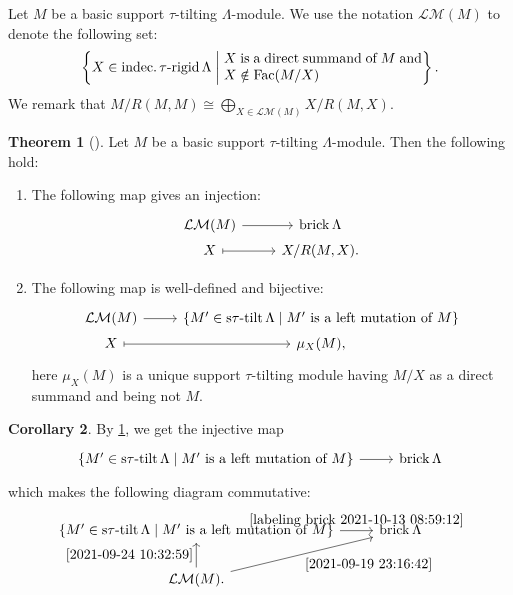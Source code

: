\documentclass[pdftex,a4paper]{article}
\numberwithin{equation}{subsection}
\theoremstyle{definition}
\newtheorem{theorem}{Theorem}[section]
\newtheorem{corollary}[theorem]{Corollary}
\newcommand{\setmid}{\; \middle|\;}
\newcommand{\stautilt}{\operatorname{\mathrm{s\tau-tilt}}}
\newcommand{\itaurigid}{\operatorname{\mathrm{indec.\tau-rigid}}}
\newcommand{\Fac}{\operatorname{\mathrm{Fac}}}
\newcommand{\brick}{\operatorname{\mathrm{brick}}}
\begin{document}
Let \(M\) be a basic support \(\tau\)-tilting \(\Lambda\)-module.
We use the notation \(\mathcal{LM}(M)\) to denote the following set:
\begin{equation}
	\left\{X\in \itaurigid \Lambda \setmid \parbox{5cm}{\(X\) is a direct summand of \(M\) and \(X\notin \Fac(M/X)\)}\right\}.
\end{equation}
We remark that \(M/R(M,M)\cong \bigoplus_{X\in \mathcal{LM}(M)} X/R(M,X)\).
\begin{theorem}
	[{\cite[Theorem 2.3, Proposition 2.13]{MR4139031}}]\label{labeling method tau 2021-10-13 17:35:07}
	Let \(M\) be a basic support \(\tau\)-tilting \(\Lambda\)-module.
	Then the following hold:
	\begin{enumerate}
		\item The following map gives an injection:
		      \begin{equation}\label{2021-09-19 23:16:42}
			      \begin{tikzcd}[row sep=1pt]
				      \mathcal{LM}(M)\ar[r]& \brick \Lambda\\
				      X \ar[r,mapsto]& X/R(M,X).
			      \end{tikzcd}
		      \end{equation}
		\item The following map is well-defined and bijective:
		      \begin{equation}\label{2021-09-24 10:32:59}
			      \begin{tikzcd}[row sep=1pt]
				      \mathcal{LM}(M)\ar[r]& \left\{ M'\in \stautilt \Lambda \setmid \text{\(M'\) is a left mutation of \(M\)}\right\}\\
				      X \ar[r,mapsto] & \mu_X(M),
			      \end{tikzcd}
		      \end{equation}
		      here \(\mu_X(M)\) is a unique support \(\tau\)-tilting module having \(M/X\) as a direct summand and being not \(M\).
		      \label{asai brick}
	\end{enumerate}
\end{theorem}
\begin{corollary}
	By \cref{labeling method tau 2021-10-13 17:35:07}, we get the injective map
	\begin{equation}\label{labeling brick 2021-10-13 08:59:12}
		\begin{tikzcd}[row sep=1pt]
			\left\{ M'\in \stautilt \Lambda \setmid \text{\(M'\) is a left mutation of \(M\)}\right\}\ar[r]&\brick \Lambda\\
		\end{tikzcd}
	\end{equation}
	which makes the following diagram commutative:
	\begin{equation}
		\begin{tikzcd}
			\left\{ M'\in \stautilt \Lambda \setmid \text{\(M'\) is a left mutation of \(M\)} \right\}\ar[r,"\eqref{labeling brick 2021-10-13 08:59:12}"]&\brick \Lambda\\
			\mathcal{LM}(M)\ar[u,"\eqref{2021-09-24 10:32:59}"] \ar[ur,"\eqref{2021-09-19 23:16:42}"'].&
		\end{tikzcd}
	\end{equation}
\end{corollary}
\end{document}
